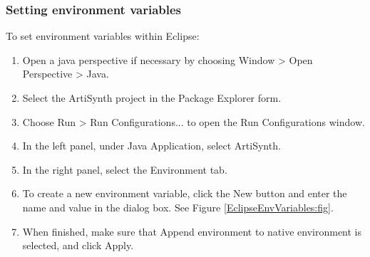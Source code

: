 \subsubsection {Setting environment variables}
\label{SettingEnvironmentVariables}

To set environment variables within Eclipse:

\begin{enumerate}

\item Open a java perspective if necessary by choosing
  {\sf Window > Open Perspective > Java}.

\item Select the ArtiSynth project in the {\sf Package Explorer} form.

\item Choose {\sf Run > Run Configurations...} to open the {\sf Run
  Configurations} window.

\item In the left panel, under {\sf Java Application}, select {\sf ArtiSynth}.

\item In the right panel, select the {\sf Environment} tab.

\item To create a new environment variable, click the {\sf New} button and
  enter the name and value in the dialog box. 
See Figure \ref{EclipseEnvVariables:fig}.

\item When finished, make sure that {\sf Append environment to native
  environment} is selected, and click {\sf Apply}.

\end{enumerate}

